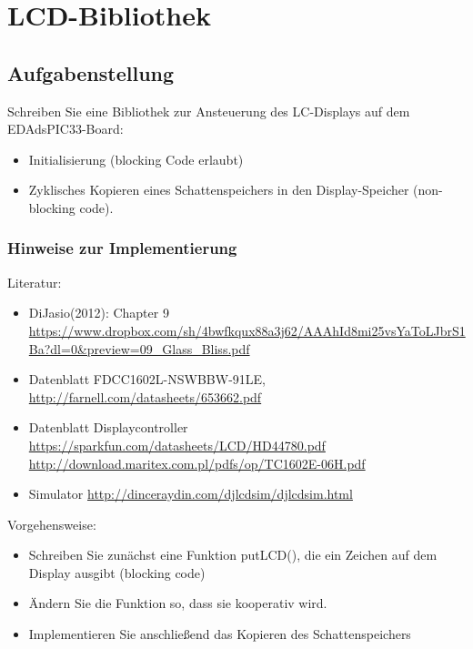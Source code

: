 \section{LCD-Bibliothek}
\subsection{Aufgabenstellung}
Schreiben Sie eine Bibliothek zur Ansteuerung des LC-Displays auf dem EDAdsPIC33-Board:
\begin{itemize}
	\item Initialisierung (blocking Code erlaubt)
	\item Zyklisches Kopieren eines Schattenspeichers in den Display-Speicher\newline
			(non-blocking code).
\end{itemize}

\subsubsection*{Hinweise zur Implementierung}

Literatur:
\begin{itemize}
	\item DiJasio(2012): Chapter 9\newline
			\url{https://www.dropbox.com/sh/4bwfkqux88a3j62/AAAhId8mi25vsYaToLJbrS1Ba?dl=0\&preview=09_Glass_Bliss.pdf}
	\item Datenblatt FDCC1602L-NSWBBW-91LE, \newline \url{http://farnell.com/datasheets/653662.pdf}
	\item Datenblatt Displaycontroller \newline
			\url{https://sparkfun.com/datasheets/LCD/HD44780.pdf}\newline
			\url{http://download.maritex.com.pl/pdfs/op/TC1602E-06H.pdf}
	\item Simulator \newline
	 \url{http://dinceraydin.com/djlcdsim/djlcdsim.html}
	
\end{itemize}

Vorgehensweise:
\begin{itemize}
	\item Schreiben Sie zunächst eine Funktion putLCD(), die ein Zeichen auf dem Display ausgibt (blocking code)
	\item Ändern Sie die Funktion so, dass sie kooperativ wird.
	\item Implementieren Sie anschließend das Kopieren des Schattenspeichers
\end{itemize}


